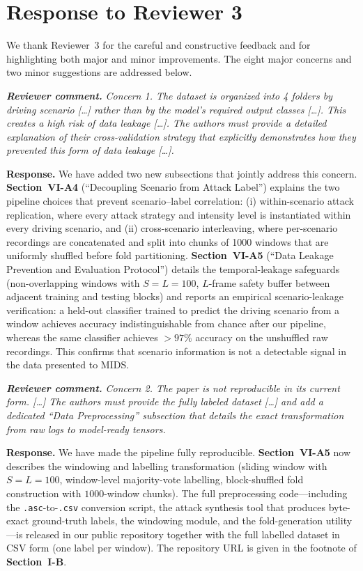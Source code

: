 \documentclass[11pt,a4paper]{article}
\newcommand{\rcomment}[1]{%
  \par\medskip
  \begingroup
  \itshape
  \textbf{Reviewer comment.}\,\,#1
  \endgroup
  \par
}
\newcommand{\rresponse}[1]{%
  \par
  \begingroup
  \color{NavyBlue}
  \textbf{Response.}\,\,#1
  \endgroup
  \par\medskip
}
\newcommand{\xref}[1]{\textbf{#1}}
\begin{document}
\section*{Response to Reviewer 3}

We thank Reviewer~3 for the careful and constructive feedback and
for highlighting both major and minor improvements. The eight
major concerns and two minor suggestions are addressed below.

\rcomment{Concern 1. The dataset is organized into 4 folders by
driving scenario [\dots] rather than by the model's required
output classes [\dots]. This creates a high risk of data leakage
[\dots]. The authors must provide a detailed explanation of their
cross-validation strategy that explicitly demonstrates how they
prevented this form of data leakage [\dots].}
\rresponse{We have added two new subsections that jointly address
this concern. \xref{Section~VI-A4} (``Decoupling Scenario from
Attack Label'') explains the two pipeline choices that prevent
scenario--label correlation: (i) within-scenario attack
replication, where every attack strategy and intensity level is
instantiated within every driving scenario, and (ii)
cross-scenario interleaving, where per-scenario recordings are
concatenated and split into chunks of 1000 windows that are
uniformly shuffled before fold partitioning.
\xref{Section~VI-A5} (``Data Leakage Prevention and Evaluation
Protocol'') details the temporal-leakage safeguards
(non-overlapping windows with $S=L=100$, $L$-frame safety buffer
between adjacent training and testing blocks) and reports an
empirical scenario-leakage verification: a held-out classifier
trained to predict the driving scenario from a window achieves
accuracy indistinguishable from chance after our pipeline,
whereas the same classifier achieves $>97\%$ accuracy on the
unshuffled raw recordings. This confirms that scenario
information is not a detectable signal in the data presented to
MIDS.}

\rcomment{Concern 2. The paper is not reproducible in its current
form. [\dots] The authors must provide the fully labeled dataset
[\dots] and add a dedicated ``Data Preprocessing'' subsection
that details the exact transformation from raw logs to
model-ready tensors.}
\rresponse{We have made the pipeline fully reproducible.
\xref{Section~VI-A5} now describes the windowing and labelling
transformation (sliding window with $S=L=100$, window-level
majority-vote labelling, block-shuffled fold construction with
$1000$-window chunks). The full preprocessing code---including
the \texttt{.asc}-to-\texttt{.csv} conversion script, the attack
synthesis tool that produces byte-exact ground-truth labels, the
windowing module, and the fold-generation utility---is released
in our public repository together with the full labelled dataset
in CSV form (one label per window). The repository URL is given
in the footnote of \xref{Section~I-B}.}
\end{document}
